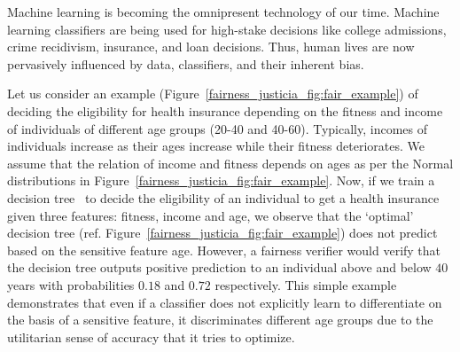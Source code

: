 Machine learning is becoming the omnipresent technology of our time. Machine learning classifiers are being used for high-stake decisions like college admissions, crime recidivism, insurance, and loan decisions. Thus, human lives are now pervasively influenced by data, classifiers, and their inherent bias.

\begin{example}\label{fairness_justicia_example:intro}
\normalfont
Let us consider an example (Figure~\ref{fairness_justicia_fig:fair_example}) of deciding the eligibility for health insurance depending on the fitness and income of individuals of different age groups (20-40 and 40-60). Typically, incomes of individuals increase as their ages increase while their fitness deteriorates. We assume that the relation of income and fitness depends on ages as per the Normal distributions in Figure~\ref{fairness_justicia_fig:fair_example}. Now, if we train a decision tree~\cite{narodytska2018learning} to decide the eligibility of an individual to get a health insurance given three features: fitness, income and age, we observe that the `optimal' decision tree (ref. Figure~\ref{fairness_justicia_fig:fair_example}) does not predict based on the sensitive feature age. However, a fairness verifier would verify that the decision tree outputs positive prediction to an individual above and below $40$ years with probabilities $0.18$ and $0.72$ respectively. This simple example demonstrates that even if a classifier does not explicitly learn to differentiate on the basis of a sensitive feature, it discriminates different age groups due to the utilitarian sense of accuracy that it tries to optimize.
\end{example}

